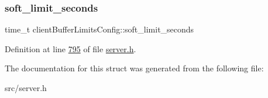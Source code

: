 \subsubsection{\texorpdfstring{soft\+\_\+limit\+\_\+seconds}{soft\_limit\_seconds}}
{\footnotesize\ttfamily time\+\_\+t client\+Buffer\+Limits\+Config\+::soft\+\_\+limit\+\_\+seconds}



Definition at line \hyperlink{server_8h_source_l00795}{795} of file \hyperlink{server_8h_source}{server.\+h}.



The documentation for this struct was generated from the following file\+:\begin{DoxyCompactItemize}
\item 
src/server.\+h\end{DoxyCompactItemize}
